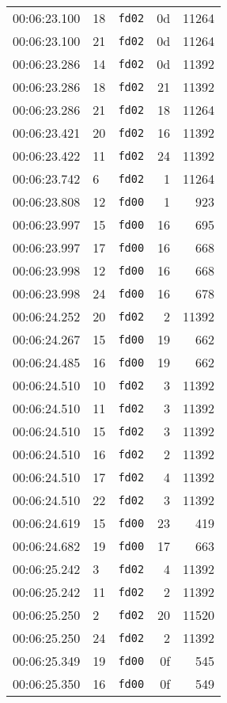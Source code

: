 \documentclass{article}
\begin{document}
\begin{longtable}{lllrr}
00:06:23.100 & 18 & \texttt{fd02} & 0d & 11264 \\
00:06:23.100 & 21 & \texttt{fd02} & 0d & 11264 \\
00:06:23.286 & 14 & \texttt{fd02} & 0d & 11392 \\
00:06:23.286 & 18 & \texttt{fd02} & 21 & 11392 \\
00:06:23.286 & 21 & \texttt{fd02} & 18 & 11264 \\
00:06:23.421 & 20 & \texttt{fd02} & 16 & 11392 \\
00:06:23.422 & 11 & \texttt{fd02} & 24 & 11392 \\
00:06:23.742 & 6 & \texttt{fd02} & 1 & 11264 \\
00:06:23.808 & 12 & \texttt{fd00} & 1 & 923 \\
00:06:23.997 & 15 & \texttt{fd00} & 16 & 695 \\
00:06:23.997 & 17 & \texttt{fd00} & 16 & 668 \\
00:06:23.998 & 12 & \texttt{fd00} & 16 & 668 \\
00:06:23.998 & 24 & \texttt{fd00} & 16 & 678 \\
00:06:24.252 & 20 & \texttt{fd02} & 2 & 11392 \\
00:06:24.267 & 15 & \texttt{fd00} & 19 & 662 \\
00:06:24.485 & 16 & \texttt{fd00} & 19 & 662 \\
00:06:24.510 & 10 & \texttt{fd02} & 3 & 11392 \\
00:06:24.510 & 11 & \texttt{fd02} & 3 & 11392 \\
00:06:24.510 & 15 & \texttt{fd02} & 3 & 11392 \\
00:06:24.510 & 16 & \texttt{fd02} & 2 & 11392 \\
00:06:24.510 & 17 & \texttt{fd02} & 4 & 11392 \\
00:06:24.510 & 22 & \texttt{fd02} & 3 & 11392 \\
00:06:24.619 & 15 & \texttt{fd00} & 23 & 419 \\
00:06:24.682 & 19 & \texttt{fd00} & 17 & 663 \\
00:06:25.242 & 3 & \texttt{fd02} & 4 & 11392 \\
00:06:25.242 & 11 & \texttt{fd02} & 2 & 11392 \\
00:06:25.250 & 2 & \texttt{fd02} & 20 & 11520 \\
00:06:25.250 & 24 & \texttt{fd02} & 2 & 11392 \\
00:06:25.349 & 19 & \texttt{fd00} & 0f & 545 \\
00:06:25.350 & 16 & \texttt{fd00} & 0f & 549 \\

\end{longtable}
\end{document}
